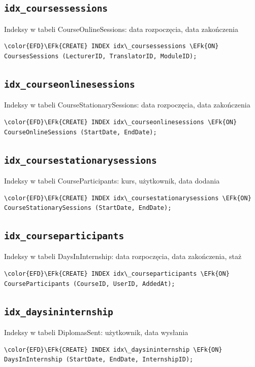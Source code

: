 \documentclass[11pt]{article}
\newcommand{\EFk}[1]{\textcolor{EFk}{\textbf{#1}}} %
\begin{document}
\subsection{\texttt{idx\_coursessessions}}
\label{sec:orgbc7d105}
Indeksy w tabeli CourseOnlineSessions: data rozpoczęcia, data zakończenia
\begin{Code}
\begin{Verbatim}
\color{EFD}\EFk{CREATE} INDEX idx\_coursessessions \EFk{ON} CoursesSessions (LecturerID, TranslatorID, ModuleID);
\end{Verbatim}
\end{Code}
\subsection{\texttt{idx\_courseonlinesessions}}
\label{sec:orgc1c2261}
Indeksy w tabeli CourseStationarySessions: data rozpoczęcia, data zakończenia
\begin{Code}
\begin{Verbatim}
\color{EFD}\EFk{CREATE} INDEX idx\_courseonlinesessions \EFk{ON} CourseOnlineSessions (StartDate, EndDate);
\end{Verbatim}
\end{Code}
\subsection{\texttt{idx\_coursestationarysessions}}
\label{sec:org30841c9}
Indeksy w tabeli CourseParticipants: kurs, użytkownik, data dodania
\begin{Code}
\begin{Verbatim}
\color{EFD}\EFk{CREATE} INDEX idx\_coursestationarysessions \EFk{ON} CourseStationarySessions (StartDate, EndDate);
\end{Verbatim}
\end{Code}
\subsection{\texttt{idx\_courseparticipants}}
\label{sec:org1662631}
Indeksy w tabeli DaysInInternship: data rozpoczęcia, data zakończenia, staż
\begin{Code}
\begin{Verbatim}
\color{EFD}\EFk{CREATE} INDEX idx\_courseparticipants \EFk{ON} CourseParticipants (CourseID, UserID, AddedAt);
\end{Verbatim}
\end{Code}
\subsection{\texttt{idx\_daysininternship}}
\label{sec:org2900c8e}
Indeksy w tabeli DiplomasSent: użytkownik, data wysłania
\begin{Code}
\begin{Verbatim}
\color{EFD}\EFk{CREATE} INDEX idx\_daysininternship \EFk{ON} DaysInInternship (StartDate, EndDate, InternshipID);
\end{Verbatim}
\end{Code}
\end{document}
